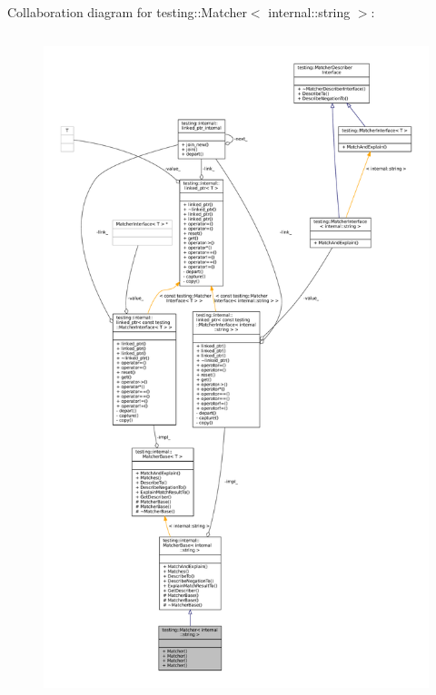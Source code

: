 Collaboration diagram for testing\+:\+:Matcher$<$ internal\+:\+:string $>$\+:
\nopagebreak
\begin{figure}[H]
\begin{center}
\leavevmode
\includegraphics[height=550pt]{classtesting_1_1Matcher_3_01internal_1_1string_01_4__coll__graph}
\end{center}
\end{figure}
